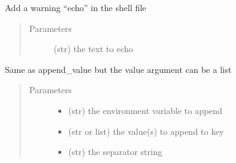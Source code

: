 \documentclass[a4paper,10pt,english]{sphinxmanual}
\begin{document}
\begin{fulllineitems}
\begin{fulllineitems}
\begin{quote}
\begin{description}
\end{description}\end{quote}

\end{fulllineitems}


\begin{fulllineitems}
\label{\detokenize{apidoc_src/src:src.fileEnviron.FileEnviron.add_warning}}
Add a warning “echo” in the shell file
\begin{quote}\begin{description}
\item[{Parameters}] \leavevmode
{} \textendash{} (str) the text to echo

\end{description}\end{quote}

\end{fulllineitems}


\begin{fulllineitems}
\label{\detokenize{apidoc_src/src:src.fileEnviron.FileEnviron.append}}
Same as append\_value but the value argument can be a list
\begin{quote}\begin{description}
\item[{Parameters}] \leavevmode\begin{itemize}
\item {} 
 \textendash{} (str) the environment variable to append

\item {} 
 \textendash{} (str or list) the value(s) to append to key

\item {} 
 \textendash{} (str) the separator string

\end{itemize}

\end{description}\end{quote}


\end{fulllineitems}
\end{fulllineitems}
\end{document}
